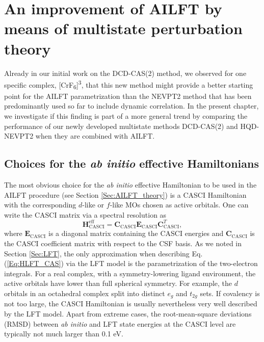 \chapter{An improvement of AILFT by means of multistate perturbation theory}
Already in our initial work on the DCD-CAS(2) method,\cite{PathaLN_2017_234109} we observed for one specific complex, [CrF\textsubscript{6}]\textsuperscript{3\textminus}, that this new method might provide a better starting point for the AILFT parametrization than the NEVPT2 method that has been predominantly used so far to include dynamic correlation. In the present chapter, we investigate if this finding is part of a more general trend by comparing the performance of our newly developed multistate methods DCD-CAS(2) and HQD-NEVPT2 when they are combined with AILFT.

\section{Choices for the \textit{ab initio} effective Hamiltonians}
The most obvious choice for the \textit{ab initio} effective Hamiltonian to be used in the AILFT procedure (see Section \ref{Sec:AILFT_theory}) is a CASCI Hamiltonian with the corresponding $d$-like or $f$-like MOs chosen as active orbitals. One can write the CASCI matrix via a spectral resolution as
	\begin{equation}
	\label{Eq:HLFT_CAS}
	{\mathbf{H}}_{{\text{CASCI}}}^{{\text{eff}}} = {{\mathbf{C}}_{{\text{CASCI}}}}{{\mathbf{E}}_{{\text{CASCI}}}}{\mathbf{C}}_{{\text{CASCI}}}^T,
	\end{equation}
where ${{\mathbf{E}}_{{\text{CASCI}}}}$ is a diagonal matrix containing the CASCI energies and ${{\mathbf{C}}_{{\text{CASCI}}}}$ is the CASCI coefficient matrix with respect to the CSF basis. As we noted in Section \ref{Sec:LFT}, the only approximation when describing Eq. (\ref{Eq:HLFT_CAS}) via the LFT model is the parametrization of the two-electron integrals. For a real complex, with a symmetry-lowering ligand environment, the active orbitals have lower than full spherical symmetry. For example, the $d$ orbitals in an octahedral complex split into distinct $e_g$ and $t_{2g}$ sets. If covalency is not too large, the CASCI Hamiltonian is usually nevertheless very well described by the LFT model. Apart from extreme cases, the root-mean-square deviations (RMSD) between \textit{ab initio} and LFT state energies at the CASCI level are typically not much larger than 0.1 eV.\cite{SinghEAN_2017_2}

